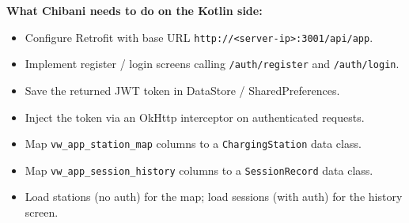 \documentclass[12pt,a4paper]{report}
\begin{document}
\vspace{0.5cm}

\begin{tcolorbox}[colback=lightblue, colframe=midblue, arc=4pt]
\textbf{What Chibani needs to do on the Kotlin side:}
\begin{itemize}
  \item Configure Retrofit with base URL \texttt{http://<server-ip>:3001/api/app}.
  \item Implement register / login screens calling \texttt{/auth/register} and \texttt{/auth/login}.
  \item Save the returned JWT token in DataStore / SharedPreferences.
  \item Inject the token via an OkHttp interceptor on authenticated requests.
  \item Map \texttt{vw\_app\_station\_map} columns to a \texttt{ChargingStation} data class.
  \item Map \texttt{vw\_app\_session\_history} columns to a \texttt{SessionRecord} data class.
  \item Load stations (no auth) for the map; load sessions (with auth) for the history screen.
\end{itemize}
\end{tcolorbox}
\end{document}
